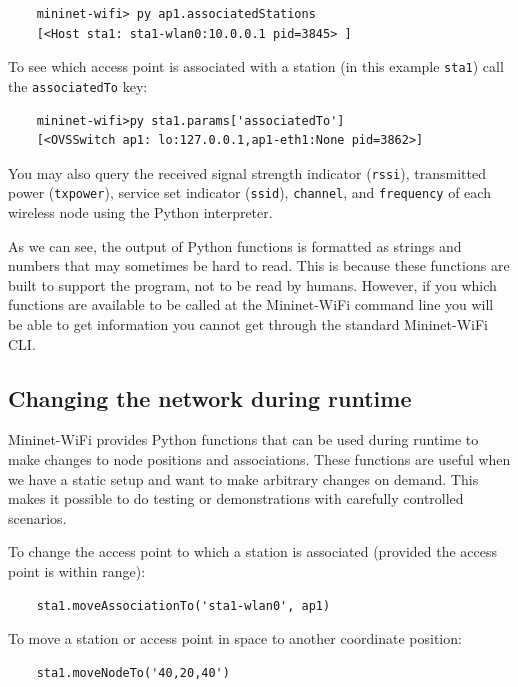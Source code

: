 \begin{verbatim}
    mininet-wifi> py ap1.associatedStations
    [<Host sta1: sta1-wlan0:10.0.0.1 pid=3845> ]
\end{verbatim}
   
\noindent To see which access point is associated with a station (in this example \texttt{sta1}) call the \texttt{associatedTo} key:

\begin{verbatim}
    mininet-wifi>py sta1.params['associatedTo']
    [<OVSSwitch ap1: lo:127.0.0.1,ap1-eth1:None pid=3862>]
\end{verbatim}
        

\noindent You may also query the received signal strength indicator (\texttt{rssi}), transmitted power (\texttt{txpower}), service set indicator (\texttt{ssid}), \texttt{channel}, and \texttt{frequency} of each wireless node using the Python interpreter.

\noindent As we can see, the output of Python functions is formatted as strings and numbers that may sometimes be hard to read. This is because these functions are built to support the program, not to be read by humans. However, if you which functions are available to be called at the Mininet-WiFi command line you will be able to get information you cannot get through the standard Mininet-WiFi CLI.

\subsection{Changing the network during runtime}

Mininet-WiFi provides Python functions that can be used during runtime to make changes to node positions and associations. These functions are useful when we have a static setup and want to make arbitrary changes on demand. This makes it possible to do testing or demonstrations with carefully controlled scenarios.

To change the access point to which a station is associated (provided the access point is within range):

\begin{verbatim}
    sta1.moveAssociationTo('sta1-wlan0', ap1) 
\end{verbatim}
    

\noindent To move a station or access point in space to another coordinate position:

\begin{verbatim}
    sta1.moveNodeTo('40,20,40')
\end{verbatim}
    
